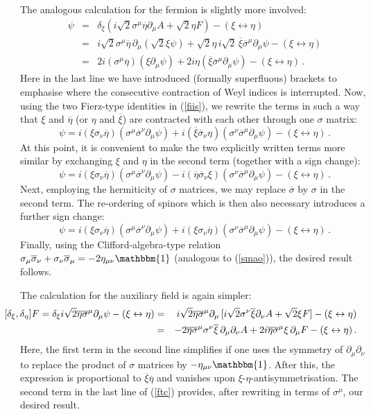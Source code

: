 \documentclass[12pt]{article}
\newcommand{\be}{\begin{equation}}
\newcommand{\ee}{\end{equation}}
\newcommand{\bea}{\begin{eqnarray}}
\newcommand{\eea}{\end{eqnarray}}
\newcommand{\ol}{\overline}
\numberwithin{equation}{section}
\begin{document}
The analogous calculation for the fermion is slightly more involved:
\bea
[\delta_\xi,\delta_\eta] \psi &=& \delta_\xi ( i\sqrt{2}\sigma^\mu\ol{\eta}\partial_\mu A +\sqrt{2} \eta F) - (\xi\leftrightarrow \eta)
\nonumber
\\
&=& i\sqrt{2} \sigma^\mu \ol{\eta}\,\partial_\mu(\sqrt{2}\xi \psi) + \sqrt{2}\eta\,i\sqrt{2}\,\ol{\xi}\ol{\sigma}^\mu\partial_\mu \psi - (\xi\leftrightarrow \eta)
\label{fcal}
\\
&=& 2i (\sigma^\mu\ol{\eta})(\xi \partial_\mu \psi) + 2i\eta (\ol{\xi}\ol{\sigma}^\mu\partial_\mu \psi) - (\xi\leftrightarrow \eta)\,.
\nonumber
\eea
Here in the last line we have introduced (formally superfluous) brackets to emphasise where the consecutive contraction of Weyl indices is interrupted.
Now, using the two Fierz-type identities in (\ref{fiis}), we 
rewrite the terms in such a way that $\xi$ and $\ol{\eta}$ (or $\eta$ and $\ol{\xi}$) are contracted with each other through one $\sigma$ matrix:
\be
[\delta_\xi,\delta_\eta] \psi = i(\xi\sigma_\nu\ol{\eta})(\sigma^\mu \ol{\sigma}^\nu\partial_\mu\psi)+i(\ol{\xi}\ol{\sigma}_\nu\eta)(\sigma^\nu\ol{\sigma}^\mu \partial_\mu\psi) - (\xi\leftrightarrow \eta)\,.
\ee
At this point, it is convenient to make the two explicitly written terms more similar by exchanging $\xi$ and $\eta$ in the second term (together with a sign change):
\be
[\delta_\xi,\delta_\eta] \psi = i(\xi\sigma_\nu\ol{\eta})(\sigma^\mu \ol{\sigma}^\nu\partial_\mu\psi)-i(\ol{\eta}\ol{\sigma}_\nu\xi)(\sigma^\nu\ol{\sigma}^\mu\partial_\mu\psi) - (\xi\leftrightarrow \eta)\,.
\ee
Next, employing the hermiticity of $\sigma$ matrices, we may replace $\ol{\sigma}$ by $\sigma$ in the second term. The re-ordering of spinors which is then also necessary introduces a further sign change:
\be
[\delta_\xi,\delta_\eta] \psi = i(\xi\sigma_\nu\ol{\eta})(\sigma^\mu \ol{\sigma}^\nu\partial_\mu\psi) + i(\xi \sigma_\nu\ol{\eta})(\sigma^\nu\ol{\sigma}^\mu\partial_\mu\psi) - (\xi\leftrightarrow \eta)\,.
\ee
Finally, using the Clifford-algebra-type relation $\sigma_\mu\ol{\sigma}_\nu + \sigma_\nu\ol{\sigma}_\mu = -2\eta_{\mu\nu}\mathbbm{1}$
(analogous to (\ref{smao})), the desired result follows.

The calculation for the auxiliary field is again simpler:
\bea
\hspace*{-1cm}[\delta_\xi,\delta_\eta] F = \delta_\xi i\sqrt{2} \ol{\eta}\ol{\sigma}^\mu \partial_\mu \psi - (\xi\leftrightarrow \eta)
&=& i\sqrt{2}\ol{\eta}\ol{\sigma}^\mu \partial_\mu \,[ i\sqrt{2} \sigma^\nu\ol{\xi}\partial_\nu A+\sqrt{2}\xi F ] - (\xi\leftrightarrow \eta) \label{ftc}
\\ \nonumber
&=& -2\ol{\eta}\ol{\sigma}^\mu \sigma^\nu \ol{\xi}\,\partial_\mu \partial_\nu A + 2 i \ol{\eta}\ol{\sigma}^\mu \xi\,\partial_\mu F - (\xi\leftrightarrow \eta)\,. 
\eea
Here, the first term in the second line simplifies if one uses the symmetry of $\partial_\mu\partial_\nu$ to replace the product of $\sigma$ matrices by $-\eta_{\mu\nu}\mathbbm{1}$. After this, the expression is proportional to $\ol{\xi}\ol{\eta}$ and vanishes upon $\xi$-$\eta$-antisymmetrisation. The second term in the last line of (\ref{ftc}) provides, after rewriting in terms of $\sigma^\mu$, our desired result.
\end{document}
